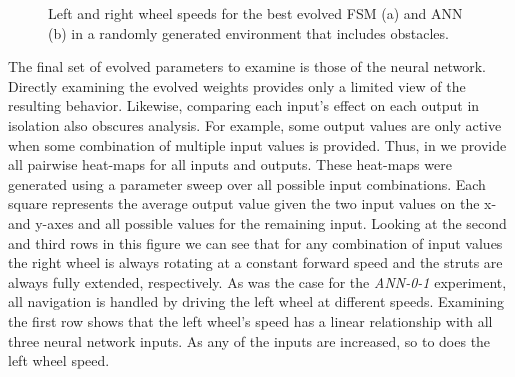 \begin{figure}[!ht]
    \centering

    \hfil

    \vspace{-0.1in}

    \caption{Left and right wheel speeds for the best evolved FSM (a) and ANN (b) in a randomly generated environment that includes obstacles.}
    \label{fig:40-2-best-speed}

    \vspace{-0.1in}

\end{figure}





The final set of evolved parameters to examine is those of the neural network.
%
Directly examining the evolved weights provides only a limited view of the resulting behavior. Likewise, comparing each input's effect on each output in isolation also obscures analysis.
%
For example, some output values are only active when some combination of multiple input values is provided.
%
Thus, in  we provide all pairwise heat-maps for all inputs and outputs.
%
These heat-maps were generated using a parameter sweep over all possible input combinations. Each square represents the average output value given the two input values on the x- and y-axes and all possible values for the remaining input.
%
Looking at the second and third rows in this figure we can see that for any combination of input values the right wheel is always rotating at a constant forward speed and the struts are always fully extended, respectively.
%
As was the case for the \emph{ANN-0-1} experiment, all navigation is handled by driving the left wheel at different speeds.
%
Examining the first row shows that the left wheel's speed has a linear relationship with all three neural network inputs.
%
As any of the inputs are increased, so to does the left wheel speed.


